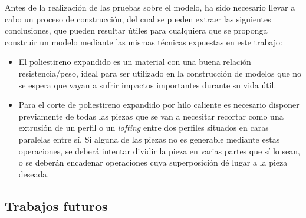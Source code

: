 Antes de la realización de las pruebas sobre el modelo, ha sido necesario llevar a cabo un proceso de construcción, del cual se pueden extraer las siguientes conclusiones, que pueden resultar útiles para cualquiera que se proponga construir un modelo mediante las mismas técnicas expuestas en este trabajo:
\begin{itemize}
\item El poliestireno expandido es un material con una buena relación resistencia/peso, ideal para ser utilizado en la construcción de modelos que no se espera que vayan a sufrir impactos importantes durante su vida útil.
\item Para el corte de poliestireno expandido por hilo caliente es necesario disponer previamente de todas las piezas que se van a necesitar recortar como una extrusión de un perfil o un \emph{lofting} entre dos perfiles situados en caras paralelas entre sí. Si alguna de las piezas no es generable mediante estas operaciones, se deberá intentar dividir la pieza en varias partes que sí lo sean, o se deberán encadenar operaciones cuya superposición dé lugar a la pieza deseada.
\end{itemize}


\subsection{Trabajos futuros}
\label{sec:conclusions:future}

